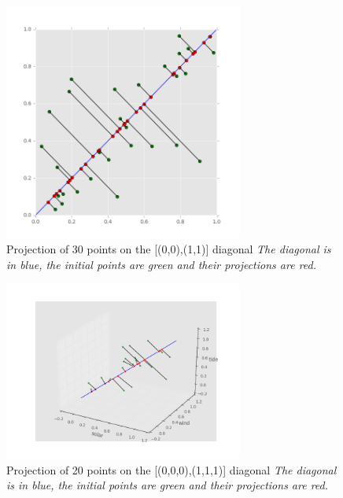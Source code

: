 \documentclass{article}
\begin{document}
\begin{figure}
  	\centering
    \includegraphics[width=0.7\textwidth]{proj2Ddiag0.png}
    \caption{Projection of 30 points on the [(0,0),(1,1)] diagonal \emph{The diagonal is in blue, the initial points are green and their projections are red.}}
\end{figure}

	\begin{figure}
  	\centering
    \includegraphics[width=0.7\textwidth]{proj3d.png}
    \caption{Projection of 20 points on the [(0,0,0),(1,1,1)] diagonal \emph{The diagonal is in blue, the initial points are green and their projections are red.}}
\end{figure}
	   
\end{document}
